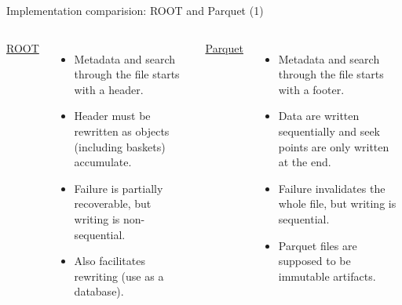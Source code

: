 \documentclass[aspectratio=169]{beamer}
\begin{document}
\begin{frame}{Implementation comparision: ROOT and Parquet (1)}
\vspace{0.5 cm}
\begin{columns}[t]
{\large \underline{ROOT}}

\begin{itemize}
\item Metadata and search through the file starts with a header.

\item Header must be rewritten as objects (including baskets) accumulate.

\item Failure is partially recoverable, but writing is non-sequential.

\item Also facilitates rewriting (use as a database).
\end{itemize}

{\large \underline{Parquet}}

\begin{itemize}
\item Metadata and search through the file starts with a footer.

\item Data are written sequentially and seek points are only written at the end.

\item Failure invalidates the whole file, but writing is sequential.

\item Parquet files are supposed to be immutable artifacts.
\end{itemize}
\end{columns}
\end{frame}
\end{document}
